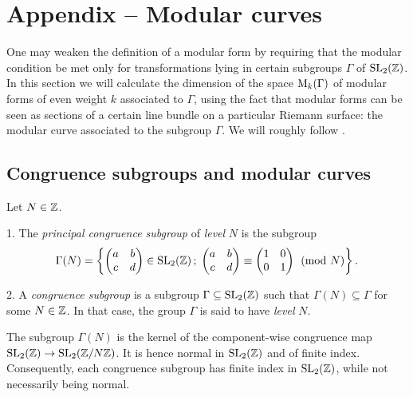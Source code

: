 \section{Appendix – Modular curves}

\newcommand{\jrm}{\mathrm{j}}

One may weaken the definition of a modular form by requiring that the modular condition be met only for transformations lying in certain subgroups $\Gamma$ of $\operatorname{SL}_2(\mathbb{Z})$. In this section we will calculate the dimension of the space $\mathrm{M}_k(\Gamma)$ of modular forms of even weight $k$ associated to $\Gamma$, using the fact that modular forms can be seen as sections of a certain line bundle on a particular Riemann surface: the modular curve associated to the subgroup $\Gamma$. We will roughly follow \cite[Ch.~1-3]{Diamond-Shurman}.

\subsection{Congruence subgroups and modular curves}

\begin{defi}
 Let $N\in \mathbb{Z}$.
 
 1. The \emph{principal congruence subgroup} of \emph{level} $N$ is the subgroup
 \[\Gamma(N)=\left\{\begin{pmatrix} a & b \\ c & d \end{pmatrix}\in\operatorname{SL}_2(\mathbb{Z})\,;\; \begin{pmatrix}a & b \\ c & d\end{pmatrix} \equiv \begin{pmatrix}1 & 0 \\ 0 & 1\end{pmatrix} \pmod{N}\right\}.\]
 
 2. A \emph{congruence subgroup} is a subgroup $\Gamma\subseteq\operatorname{SL}_2(\mathbb{Z})$ such that $\Gamma(N)\subseteq\Gamma$ for some $N\in\mathbb{Z}$. In that case, the group $\Gamma$ is said to have \emph{level} $N$. 
\end{defi}

\begin{rmk}
 The subgroup $\Gamma(N)$ is the kernel of the component-wise congruence map $\operatorname{SL}_2(\mathbb{Z})\to\operatorname{SL}_2(\mathbb{Z}/N\mathbb{Z})$. It is hence normal in $\operatorname{SL}_2(\mathbb{Z})$ and of finite index. Consequently, each congruence subgroup has finite index in $\operatorname{SL}_2(\mathbb{Z})$, while not  necessarily being normal.
\end{rmk}

